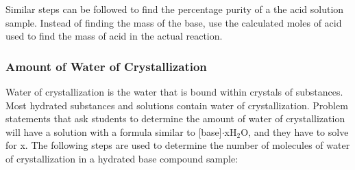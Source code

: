 Similar steps can be followed to find the percentage purity of a the acid solution sample. Instead of finding the mass of the base, use the calculated moles of acid used to find the mass of acid in the actual reaction.


\subsubsection{Amount of Water of Crystallization}

Water of crystallization is the water that is bound within crystals of substances. Most hydrated substances and solutions contain water of crystallization. Problem statements that ask students to determine the amount of water of crystallization will have a solution with a formula similar to [base]$\cdot$xH$_2$O, and they have to solve for x. The following steps are used to determine the number of molecules of water of crystallization in a hydrated base compound sample:

